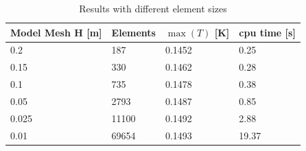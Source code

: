 \begin{table}
\caption{Results with different element sizes}
\label{tb:struct1}
\begin{center}
\begin{tabular}{llll} \hline
Model Mesh H [m]  & Elements & $\max (T)$ [K] & cpu time [s]\\ \hline
0.2 & 187 &  0.1452  & 0.25 \\
0.15 & 330 & 0.1462  & 0.28 \\ 
0.1 &  735 & 0.1478  & 0.38 \\
0.05 & 2793 & 0.1487  & 0.85 \\ 
0.025 & 11100 & 0.1492 & 2.88 \\ 
0.01  & 69654 & 0.1493 & 19.37 \\ \hline
\end{tabular}
\end{center}
\end{table}

\hfill



